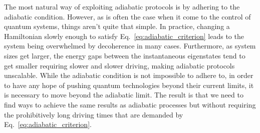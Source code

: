     The most natural way of exploiting adiabatic protocols is by adhering to the adiabatic condition. However, as is often the case when it come to the control of quantum systems, things aren't quite that simple. In practice, changing a Hamiltonian slowly enough to satisfy Eq.~\eqref{eq:adiabatic_criterion} leads to the system being overwhelmed by decoherence in many cases. Furthermore, as system sizes get larger, the energy gaps between the instantaneous eigenstates tend to get smaller requiring slower and slower driving, making adiabatic protocols unscalable. While the adiabatic condition is not impossible to adhere to, in order to have any hope of pushing quantum technologies beyond their current limits, it is necessary to move beyond the adiabatic limit. The result is that we need to find ways to achieve the same results as adiabatic processes but without requiring the prohibitively long driving times that are demanded by Eq.~\eqref{eq:adiabatic_criterion}.
    
